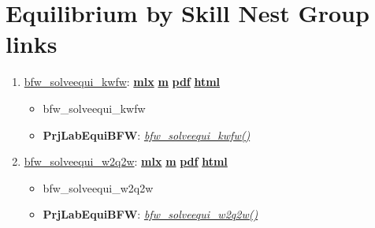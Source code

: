\documentclass[
]{book}
\providecommand{\tightlist}{%
  \setlength{\itemsep}{0pt}\setlength{\parskip}{0pt}}
\begin{document}
\hypertarget{equilibrium-by-skill-nest-group-links}{%
\section{Equilibrium by Skill Nest Group links}\label{equilibrium-by-skill-nest-group-links}}

\begin{enumerate}
\def\labelenumi{\arabic{enumi}.}
\tightlist
\item
  \href{https://fanwangecon.github.io/PrjLabEquiBFW/PrjLabEquiBFW/doc/solveequiskl/htmlpdfm/bfwx_solveequi_kwfw.html}{bfw\_solveequi\_kwfw}: \href{https://github.com/FanWangEcon/PrjLabEquiBFW/blob/master/PrjLabEquiBFW/doc/solveequiskl/bfwx_solveequi_kwfw.mlx}{\textbf{mlx}} \textbar{} \href{https://github.com/FanWangEcon/PrjLabEquiBFW/blob/master/PrjLabEquiBFW/doc/solveequiskl/htmlpdfm/bfwx_solveequi_kwfw.m}{\textbf{m}} \textbar{} \href{https://github.com/FanWangEcon/PrjLabEquiBFW/blob/master/PrjLabEquiBFW/doc/solveequiskl/htmlpdfm/bfwx_solveequi_kwfw.pdf}{\textbf{pdf}} \textbar{} \href{https://fanwangecon.github.io/PrjLabEquiBFW/PrjLabEquiBFW/doc/solveequiskl/htmlpdfm/bfwx_solveequi_kwfw.html}{\textbf{html}}

  \begin{itemize}
  \tightlist
  \item
    bfw\_solveequi\_kwfw
  \item
    \textbf{PrjLabEquiBFW}: \emph{\href{https://github.com/FanWangEcon/PrjLabEquiBFW/blob/main/PrjLabEquiBFW/solveequiskl/bfw_solveequi_kwfw.m}{bfw\_solveequi\_kwfw()}}
  \end{itemize}
\item
  \href{https://fanwangecon.github.io/PrjLabEquiBFW/PrjLabEquiBFW/doc/solveequiskl/htmlpdfm/bfwx_solveequi_w2q2w.html}{bfw\_solveequi\_w2q2w}: \href{https://github.com/FanWangEcon/PrjLabEquiBFW/blob/master/PrjLabEquiBFW/doc/solveequiskl/bfwx_solveequi_w2q2w.mlx}{\textbf{mlx}} \textbar{} \href{https://github.com/FanWangEcon/PrjLabEquiBFW/blob/master/PrjLabEquiBFW/doc/solveequiskl/htmlpdfm/bfwx_solveequi_w2q2w.m}{\textbf{m}} \textbar{} \href{https://github.com/FanWangEcon/PrjLabEquiBFW/blob/master/PrjLabEquiBFW/doc/solveequiskl/htmlpdfm/bfwx_solveequi_w2q2w.pdf}{\textbf{pdf}} \textbar{} \href{https://fanwangecon.github.io/PrjLabEquiBFW/PrjLabEquiBFW/doc/solveequiskl/htmlpdfm/bfwx_solveequi_w2q2w.html}{\textbf{html}}

  \begin{itemize}
  \tightlist
  \item
    bfw\_solveequi\_w2q2w
  \item
    \textbf{PrjLabEquiBFW}: \emph{\href{https://github.com/FanWangEcon/PrjLabEquiBFW/blob/main/PrjLabEquiBFW/solveequiskl/bfw_solveequi_w2q2w.m}{bfw\_solveequi\_w2q2w()}}
  \end{itemize}
\end{enumerate}

  
\end{document}
